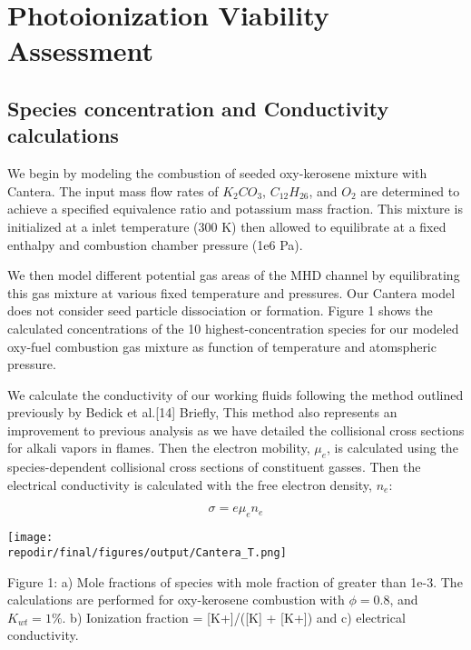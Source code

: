 
\section{Photoionization Viability Assessment}


\hypertarget{species-concentration-and-conductivity-calculations}{%
\subsection{Species concentration and Conductivity calculations}\label{species-concentration-and-conductivity-calculations}}

We begin by modeling the combustion of seeded oxy-kerosene mixture with Cantera. The input mass flow rates of $K_2CO_3$, $C_{12}H_{26}$, and $O_2$ are determined to achieve a specified equivalence ratio and potassium mass fraction. This mixture is initialized at a inlet temperature (300 K) then allowed to equilibrate at a fixed enthalpy and combustion chamber pressure (1e6 Pa).

We then model different potential gas areas of the MHD channel by equilibrating this gas mixture at various fixed temperature and pressures. Our Cantera model does not consider seed particle dissociation or formation. Figure 1 shows the calculated concentrations of the 10 highest-concentration species for our modeled oxy-fuel combustion gas mixture as function of temperature and atomspheric pressure.

We calculate the conductivity of our working fluids following the method outlined previously by Bedick et al.{[}14{]} Briefly, This method also represents an improvement to previous analysis as we have detailed the collisional cross sections for alkali vapors in flames. Then the electron mobility, \(\mu_{e}\), is calculated using the species-dependent collisional cross sections of constituent gasses. Then the electrical conductivity is calculated with the free electron density, \(n_{e}\):

\begin{equation}
\sigma = e\mu_{e}n_{e}
\end{equation}


\texttt{[image: \\repodir/final/figures/output/Cantera\_T.png]}

Figure 1: a) Mole fractions of species with mole fraction of greater than 1e-3. The calculations are performed for oxy-kerosene combustion with \(\phi = 0.8\), and \(K_{wt} = 1\%\). b) Ionization fraction = {[}K+{]}/({[}K{]} + {[}K+{]}) and c) electrical conductivity.

